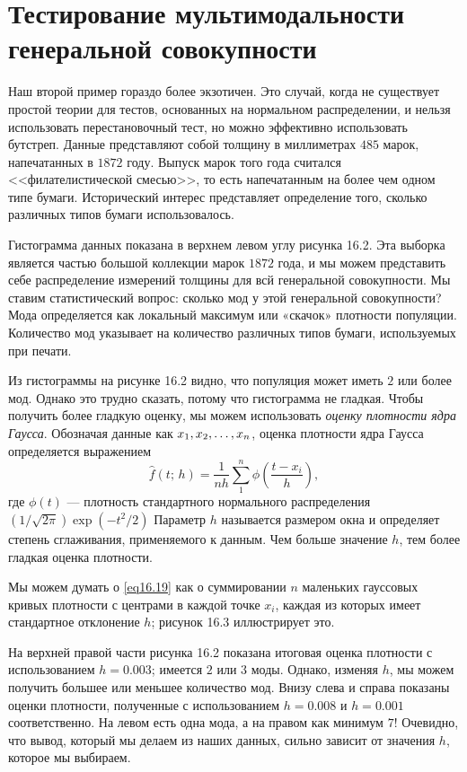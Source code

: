 \section{Тестирование мультимодальности генеральной совокупности}

Наш второй пример гораздо более экзотичен. Это случай, когда не существует простой теории для тестов, основанных на нормальном распределении, и нельзя использовать перестановочный тест, но можно эффективно использовать бутстреп. Данные представляют собой толщину в миллиметрах $485$ марок, напечатанных в $1872$ году. Выпуск марок того года считался <<филателистической смесью>>, то есть напечатанным на более чем одном типе бумаги. Исторический интерес представляет определение того, сколько различных типов бумаги использовалось.

Гистограмма данных показана в верхнем левом углу рисунка 16.2. Эта выборка является частью большой коллекции марок $1872$ года, и мы можем представить себе распределение измерений толщины для всй генеральной совокупности. Мы ставим статистический вопрос: сколько мод у этой генеральной совокупности? Мода определяется как локальный максимум или «скачок» плотности популяции. Количество мод указывает на количество различных типов бумаги, используемых при печати.

Из гистограммы на рисунке 16.2 видно, что популяция может иметь $2$ или более мод. Однако это трудно сказать, потому что гистограмма не гладкая. Чтобы получить более гладкую оценку, мы можем использовать \textit{оценку плотности ядра Гаусса}. Обозначая данные как $x_1,x_2,\ldots,x_{n}$, оценка плотности ядра Гаусса определяется выражением
\begin{equation}\label{eq16.19}
    \hat{f}(t;\,h) = \frac{1}{nh}\sum\limits_{1}^{n}\phi\left(\frac{t-x_i}{h}\right),
\end{equation}
где $\phi(t)$ --- плотность стандартного нормального распределения $\left(1/\sqrt{2\pi}\right)\exp\left(-t^2/2\right)$ Параметр $h$ называется размером окна и определяет степень сглаживания, применяемого к данным. Чем больше значение $h$, тем более гладкая оценка плотности.

Мы можем думать о \ref{eq16.19} как о суммировании $n$ маленьких гауссовых кривых плотности с центрами в каждой точке $x_i$, каждая из которых имеет стандартное отклонение $h$; рисунок 16.3 иллюстрирует это.

На верхней правой части рисунка 16.2 показана итоговая оценка плотности с использованием $h = 0.003$; имеется $2$ или $3$ моды. Однако, изменяя $h$, мы можем получить большее или меньшее количество мод. Внизу слева и справа показаны оценки плотности, полученные с использованием $h = 0.008$ и $h = 0.001$ соответственно. На левом есть одна мода, а на правом как минимум $7$! Очевидно, что вывод, который мы делаем из наших данных, сильно зависит от значения $h$, которое мы выбираем.

